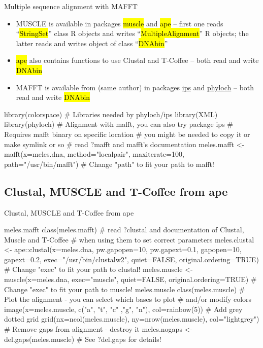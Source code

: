 \documentclass[compress, ucs, xelatex, 11pt, xcolor=svgnames,
  hyperref={
    bookmarks=true,
    unicode=true,
    colorlinks=true,
    pdftitle={Molecular data in R},
    plainpages=false,
    pdfauthor={Vojtech Zeisek},
    pdfsubject={Course about phylogeny and evolution in R},
    pdfcreator={XeLaTeX},
    pdfkeywords={R, evolution, phylogeny, molecular data},
    linkcolor=Tomato,
    anchorcolor=SaddleBrown,
    citecolor=Goldenrod,
    filecolor=DarkMagenta,
    menucolor=Sienna,
    urlcolor=DarkTurquoise,
    pdftex},
  url={hyphens, lowtilde} %
  ]{beamer}
\renewcommand{\texttt}[1]{\hl{\ttfamily #1}}
\begin{document}
\begin{frame}[fragile]{Multiple sequence alignment with MAFFT}
\begin{itemize}
 \item MUSCLE is available in packages \texttt{muscle} and \texttt{ape} -- first one reads ``\texttt{*StringSet}'' class R objects and writes ``\texttt{*MultipleAlignment}'' R objects; the latter reads and writes object of class ``\texttt{DNAbin}''
 \item \texttt{ape} also contains functions to use Clustal and T-Coffee -- both read and write \texttt{DNAbin}
 \item MAFFT is available from (same author) in packages \href{https://cran.r-project.org/web/packages/ips/index.html}{ips} and \href{http://www.christophheibl.de/Rpackages.html}{phyloch} -- both read and write \texttt{DNAbin}
\end{itemize}
  \begin{spluscode}
    library(colorspace) # Libraries needed by phyloch/ips
    library(XML)
    library(phyloch) # Alignment with mafft, you can also try package ips
    # Requires mafft binary on specific location
    # you might be needed to copy it or make symlink or so
    # read ?mafft and mafft's documentation
    meles.mafft <- mafft(x=meles.dna, method="localpair", maxiterate=100,
      path="/usr/bin/mafft") # Change "path" to fit your path to mafft!
  \end{spluscode}
\end{frame}

\subsection{Clustal, MUSCLE and T-Coffee from ape}

\begin{frame}[fragile]{Clustal, MUSCLE and T-Coffee from ape}
  \begin{spluscode}
    meles.mafft
    class(meles.mafft)
    # read ?clustal and documentation of Clustal, Muscle and T-Coffee
    # when using them to set correct parameters
    meles.clustal <- ape::clustal(x=meles.dna, pw.gapopen=10, pw.gapext=0.1,
      gapopen=10, gapext=0.2, exec="/usr/bin/clustalw2", quiet=FALSE,
      original.ordering=TRUE) # Change "exec" to fit your path to clustal!
    meles.muscle <- muscle(x=meles.dna, exec="muscle", quiet=FALSE,
      original.ordering=TRUE) # Change "exec" to fit your path to muscle!
    meles.muscle
    class(meles.muscle)
    # Plot the alignment - you can select which bases to plot
    # and/or modify colors
    image(x=meles.muscle, c("a", "t", "c" ,"g", "n"), col=rainbow(5))
    # Add grey dotted grid
    grid(nx=ncol(meles.muscle), ny=nrow(meles.muscle), col="lightgrey")
    # Remove gaps from alignment - destroy it
    meles.nogaps <- del.gaps(meles.muscle) # See ?del.gaps for details!
  \end{spluscode}
\end{frame}
\end{document}
